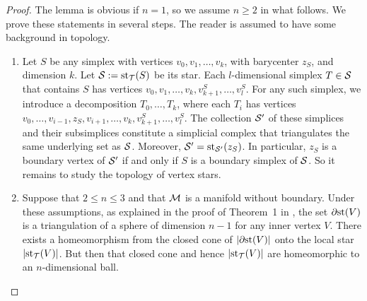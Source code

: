 \documentclass[10pt,a4paper]{article}
\begin{document}
\begin{proof}
    The lemma is obvious if $n = 1$, so we assume $n \geq 2$ in what follows. 
    We prove these statements in several steps. 
    The reader is assumed to have some background in topology. 
    \begin{enumerate}
    \item 
    Let $S$ be any simplex with vertices $v_0, v_1, \dots, v_k$, with barycenter $z_{S}$, and dimension $k$.
    Let ${\mathcal S} := \operatorname{st}_{{\mathcal T}}(S)$ be its star. 
    Each $l$-dimensional simplex $T \in {\mathcal S}$ that contains $S$ 
    has vertices $v_0, v_1, \dots, v_k, v_{k+1}^{S}, \dots, v_{l}^{S}$. 
    For any such simplex, we introduce a decomposition $T_{0}, \dots, T_{k}$, where each $T_{i}$ has vertices 
    $v_0, \dots, v_{i-1}, z_{S}, v_{i+1}, \dots, v_k, v_{k+1}^{S}, \dots, v_{l}^{S}$.
    The collection ${\mathcal S}'$ of these simplices and their subsimplices constitute a simplicial complex 
    that triangulates the same underlying set as ${\mathcal S}$.
    Moreover, ${\mathcal S}' = \operatorname{st}_{{\mathcal S}'}(z_{S})$. 
    In particular, $z_{S}$ is a boundary vertex of ${\mathcal S}'$ if and only if $S$ is a boundary simplex of ${\mathcal S}$. 
    So it remains to study the topology of vertex stars. 
    
    \item 
    Suppose that $2 \leq n \leq 3$ and that ${\mathcal M}$ is a manifold without boundary. 
    Under these assumptions, 
    as explained in the proof of Theorem~1 in \cite{Siebenmann1979},
    the set ${\partial \rm st}(V)$ is a triangulation of a sphere of dimension $n-1$ for any inner vertex $V$. 
    There exists a homeomorphism from the closed cone of $\left| {\partial \rm st}(V) \right|$ onto the local star $\left| \operatorname{st}_{{\mathcal T}}(V) \right|$.
    But then that closed cone and hence $\left| \operatorname{st}_{{\mathcal T}}(V) \right|$ are homeomorphic to an $n$-dimensional ball. 
    

\end{enumerate}
\end{proof}
\end{document}
